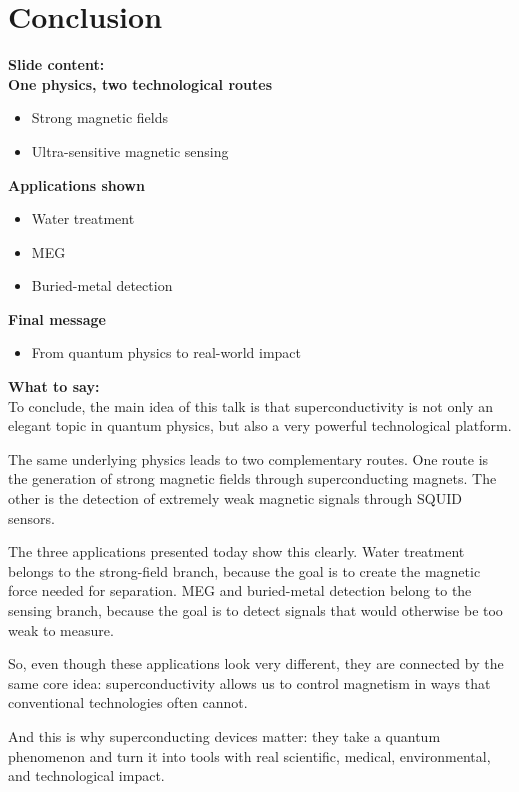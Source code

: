 \documentclass[11pt,a4paper]{article}
\newcommand{\points}[1]{{\color{accent}\textbf{Slide content:}}\\#1}
\newcommand{\speech}[1]{{\color{accent}\textbf{What to say:}}\\#1}
\begin{document}

\section{Conclusion}

\points{
\textbf{One physics, two technological routes}
\begin{itemize}
\item Strong magnetic fields
\item Ultra-sensitive magnetic sensing
\end{itemize}

\textbf{Applications shown}
\begin{itemize}
\item Water treatment
\item MEG
\item Buried-metal detection
\end{itemize}

\textbf{Final message}
\begin{itemize}
\item From quantum physics to real-world impact
\end{itemize}
}

\speech{
To conclude, the main idea of this talk is that superconductivity is not only an elegant topic in quantum physics, but also a very powerful technological platform.

The same underlying physics leads to two complementary routes. One route is the generation of strong magnetic fields through superconducting magnets. The other is the detection of extremely weak magnetic signals through SQUID sensors.

The three applications presented today show this clearly. Water treatment belongs to the strong-field branch, because the goal is to create the magnetic force needed for separation. MEG and buried-metal detection belong to the sensing branch, because the goal is to detect signals that would otherwise be too weak to measure.

So, even though these applications look very different, they are connected by the same core idea: superconductivity allows us to control magnetism in ways that conventional technologies often cannot.

And this is why superconducting devices matter: they take a quantum phenomenon and turn it into tools with real scientific, medical, environmental, and technological impact.
}
\end{document}
